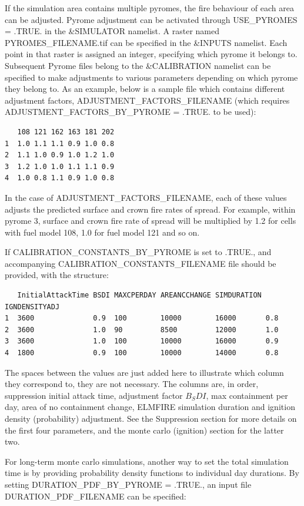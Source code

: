 If the simulation area contains multiple pyromes, the fire behaviour of each area can be adjusted. Pyrome adjustment can be activated through USE\_PYROMES = .TRUE. in the \&SIMULATOR namelist. A raster named PYROMES\_FILENAME.tif can be specified in the \&INPUTS namelist. Each point in that raster is assigned an integer, specifying which pyrome it belongs to. Subsequent Pyrome files belong to the \&CALIBRATION namelist can be specified to make adjustments to various parameters depending on which pyrome they belong to. As an example, below is a sample file which contains different adjustment factors, ADJUSTMENT\_FACTORS\_FILENAME (which requires ADJUSTMENT\_FACTORS\_BY\_PYROME = .TRUE. to be used):

\begin{verbatim}
   108 121 162 163 181 202
1  1.0 1.1 1.1 0.9 1.0 0.8
2  1.1 1.0 0.9 1.0 1.2 1.0
3  1.2 1.0 1.0 1.1 1.1 0.9
4  1.0 0.8 1.1 0.9 1.0 0.8
\end{verbatim}

In the case of ADJUSTMENT\_FACTORS\_FILENAME, each of these values adjusts the predicted surface and crown fire rates of spread. For example, within pyrome 3, surface and crown fire rate of spread will be multiplied by 1.2 for cells with fuel model 108, 1.0 for fuel model 121 and so on.  

If CALIBRATION\_CONSTANTS\_BY\_PYROME is set to .TRUE., and accompanying CALIBRATION\_CONSTANTS\_FILENAME file should be provided, with the structure:

\begin{verbatim}
   InitialAttackTime BSDI MAXCPERDAY AREANCCHANGE SIMDURATION IGNDENSITYADJ
1  3600              0.9  100        10000        16000       0.8
2  3600              1.0  90         8500         12000       1.0
3  3600              1.0  100        10000        16000       0.9
4  1800              0.9  100        10000        14000       0.8
\end{verbatim}

The spaces between the values are just added here to illustrate which column they correspond to, they are not necessary. The columns are, in order, suppression initial attack time, adjustment factor $B_SDI$, max containment per day, area of no containment change, ELMFIRE simulation duration and ignition density (probability) adjustment. See the Suppression section for more details on the first four parameters, and the monte carlo (ignition) section for the latter two. 

For long-term monte carlo simulations, another way to set the total simulation time is by providing probability density functions to individual day durations. By setting DURATION\_PDF\_BY\_PYROME = .TRUE., an input file DURATION\_PDF\_FILENAME can be specified:

